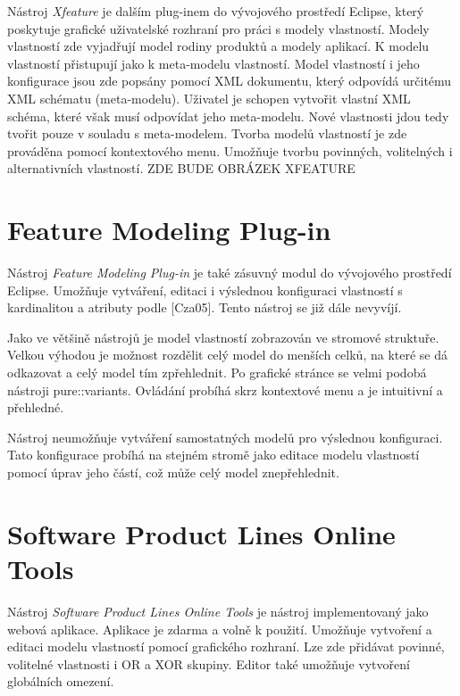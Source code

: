 Nástroj \textit{Xfeature} je dalším plug-inem do vývojového prostředí Eclipse, který poskytuje grafické uživatelské rozhraní pro práci s modely vlastností. Modely vlastností zde vyjadřují model rodiny produktů a modely aplikací. K modelu vlastností přistupují jako k meta-modelu vlastností. Model vlastností i jeho konfigurace jsou zde popsány pomocí XML dokumentu, který odpovídá určitému XML schématu (meta-modelu). Uživatel je schopen vytvořit vlastní XML schéma, které však musí odpovídat jeho meta-modelu. Nové vlastnosti jdou tedy tvořit pouze v souladu s meta-modelem. Tvorba modelů vlastností je zde prováděna pomocí kontextového menu. Umožňuje tvorbu povinných, volitelných i alternativních vlastností.
\newline
\newline
ZDE BUDE OBRÁZEK XFEATURE
\newline
\newline


\section{Feature Modeling Plug-in}
Nástroj \textit{Feature Modeling Plug-in} je také zásuvný modul do vývojového prostředí Eclipse. Umožňuje vytváření, editaci i výslednou konfiguraci vlastností s kardinalitou a atributy podle [Cza05]. Tento nástroj se již dále nevyvíjí.

Jako ve většině nástrojů je model vlastností zobrazován ve stromové struktuře. Velkou výhodou je možnost rozdělit celý model do menších celků, na které se dá odkazovat a celý model tím zpřehlednit. Po grafické stránce se velmi podobá nástroji pure::variants. Ovládání probíhá skrz kontextové menu a je intuitivní a přehledné. 

Nástroj neumožňuje vytváření samostatných modelů pro výslednou konfiguraci. Tato konfigurace probíhá na stejném stromě jako editace modelu vlastností pomocí úprav jeho částí, což může celý model znepřehlednit.

\section{Software Product Lines Online Tools}
Nástroj \textit{Software Product Lines Online Tools} je nástroj implementovaný jako webová aplikace. Aplikace je zdarma a volně k použití. Umožňuje vytvoření a editaci modelu vlastností pomocí grafického rozhraní. Lze zde přidávat povinné, volitelné vlastnosti i OR a XOR skupiny. Editor také umožňuje vytvoření globálních omezení. 

